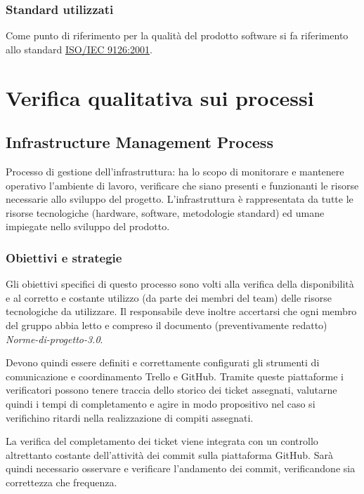 \documentclass[a4paper,11pt]{article}
\begin{document}
\subsubsection{Standard utilizzati}
Come punto di riferimento per la qualità del prodotto software si fa riferimento allo standard \underline{ISO/IEC 9126:2001}.\\
\newpage
\section{Verifica qualitativa sui processi}

\subsection{Infrastructure Management Process}
Processo di gestione dell'infrastruttura: ha lo scopo di monitorare e mantenere operativo l'ambiente di lavoro, verificare che siano presenti e funzionanti le risorse necessarie allo sviluppo del progetto.
L'infrastruttura è rappresentata da tutte le risorse tecnologiche (hardware, software, metodologie standard) ed umane impiegate nello sviluppo del prodotto.

\subsubsection{Obiettivi e strategie}
Gli obiettivi specifici di questo processo sono volti alla verifica della disponibilità e al corretto e costante utilizzo (da parte dei membri del team) delle risorse tecnologiche da utilizzare. 
Il responsabile deve inoltre accertarsi che ogni membro del gruppo abbia letto e compreso il documento (preventivamente redatto) \textit{Norme-di-progetto-3.0}.

Devono quindi essere definiti e correttamente configurati gli strumenti di comunicazione e coordinamento Trello e GitHub. Tramite queste piattaforme i verificatori possono tenere traccia dello storico dei ticket assegnati, valutarne quindi i tempi di completamento e agire in modo propositivo nel caso si verifichino ritardi nella realizzazione di compiti assegnati.

La verifica del completamento dei ticket viene integrata con un controllo altrettanto costante dell'attività dei commit sulla piattaforma GitHub. Sarà quindi necessario osservare e verificare l'andamento dei commit, verificandone sia correttezza che frequenza.
\end{document}
